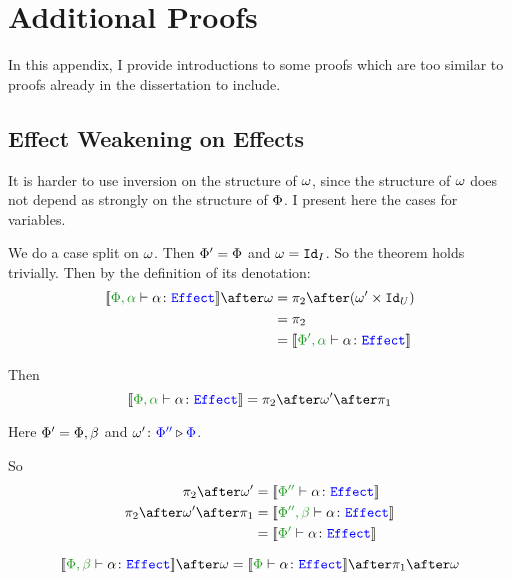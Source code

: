 \chapter{Additional Proofs}\label{WeakeningProofs}

In this appendix, I provide introductions to some proofs which are too similar to proofs already in the dissertation to include. 

\section{Effect Weakening on Effects}\label{AppendixEffectWeakeningOnEffects}

It is harder to use inversion on the structure of $\w$, since the structure of $\w$ does not depend as strongly on the structure of $\P$. I present here the cases for variables.
    
        \case{\evar}
        We do a case split on $\w$.
        \subcase{$\w = \i$}
        Then $\P' = \P$ and $\w = \Id{I}$. So the theorem holds trivially.
        Then by the definition of its denotation:    
        \begin{align*}
            \deno{\typerelation{\P,\a}{\a}{\effect}}\after\w &= \pp\after(\w'\times \Id{U}) \\
            & = \pp\\
            & = \deno{\typerelation{\P',\a}{\a}{\effect}}
        \end{align*}
        
        Then \begin{equation}
            \deno{\typerelation{\P,\a}{\a}{\effect}} = \pp\after\w'\after\p
        \end{equation}
        
        Here $\P' = \P,\b$ and $\wrel{\w'}{\P''}{\P}$.
        
        So\begin{align*}
            \pp\after\w' & = \deno{\typerelation{\P''}{\a}{\effect}}
            \\
            \pp\after\w'\after\p & =\deno{\typerelation{\P'',\b}{\a}{\effect}}\\
            &= \deno{\typerelation{\P'}{\a}{\effect}}
        \end{align*}
        
        \case{\eweaken}
        \begin{equation}
            \deno{\typerelation{\P,\b}{\a}{\effect}}\after\w = \deno{\typerelation{\P}{\a}{\effect}}\after\p\after\w
        \end{equation}
        
